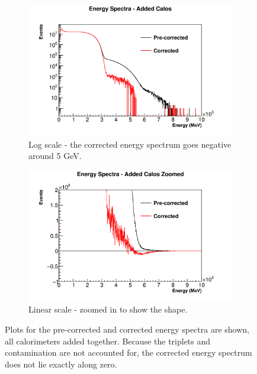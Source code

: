 	\begin{figure}[]
	\centering
	    \begin{subfigure}[]{0.8\textwidth}
		    \centering
			\includegraphics[width=\textwidth]{AddedEnergies}
		    \caption{Log scale - the corrected energy spectrum goes negative around 5 GeV.}
	    \end{subfigure}%
	    \vspace{1cm}
	    \begin{subfigure}[]{0.8\textwidth}
		    \centering
			\includegraphics[width=\textwidth]{AddedEnergiesZoomed}
		    \caption{Linear scale - zoomed in to show the shape.}
	    \end{subfigure}
	\caption[AddedEnergies]{Plots for the pre-corrected and corrected energy spectra are shown, all calorimeters added together. Because the triplets and contamination are not accounted for, the corrected energy spectrum does not lie exactly along zero.}
	\label{fig:AddedEnergies}
	\end{figure}

